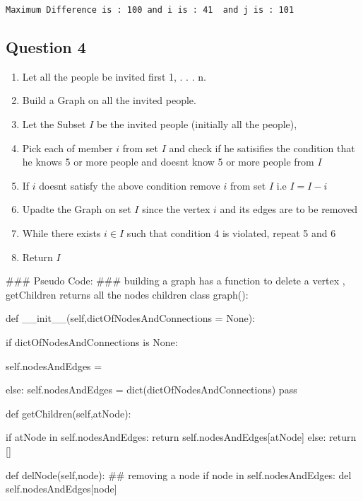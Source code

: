 \documentclass[11pt]{article}
\providecommand{\tightlist}{%
      \setlength{\itemsep}{0pt}\setlength{\parskip}{0pt}}
\begin{document}
    \begin{Verbatim}[commandchars=\\\{\}]
Maximum Difference is : 100 and i is : 41  and j is : 101

    \end{Verbatim}

    \subsection{Question 4}\label{question-4}

    \begin{enumerate}
\def\labelenumi{\arabic{enumi}.}
\tightlist
\item
  Let all the people be invited first 1, . . . n.
\item
  Build a Graph on all the invited people.
\item
  Let the Subset \(I\) be the invited people (initially all the people),
\item
  Pick each of member \(i\) from set \(I\) and check if he satisifies
  the condition that he knows 5 or more people and doesnt know 5 or more
  people from \(I\)
\item
  If \(i\) doesnt satisfy the above condition remove \(i\) from set
  \(I\) i.e \(I = I - {i}\)
\item
  Upadte the Graph on set \(I\) since the vertex \(i\) and its edges are
  to be removed
\item
  While there exists \(i ∈ I\) such that condition 4 is violated, repeat
  5 and 6
\item
  Return \(I\)
\end{enumerate}
### Pseudo Code:
### building a graph has a function to delete a vertex , getChildren returns all the nodes children
class graph():
    
    def __init__(self,dictOfNodesAndConnections = None):
        
        if dictOfNodesAndConnections is None:
            
        
            self.nodesAndEdges = {}
            
        else:
            self.nodesAndEdges = dict(dictOfNodesAndConnections)
        pass
    
    def getChildren(self,atNode):
        
        if atNode in self.nodesAndEdges:
            return self.nodesAndEdges[atNode]
        else:
            return []
    
    def delNode(self,node):
        ## removing a node
        if node in self.nodesAndEdges: 
            del self.nodesAndEdges[node]
        
\end{document}
